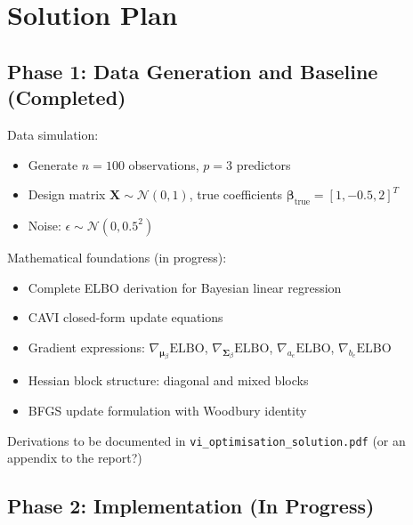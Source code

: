 \documentclass[11pt]{article}
\newcommand{\N}{\mathcal{N}}
\newcommand{\ELBO}{\text{ELBO}}
\begin{document}
\section*{Solution Plan}

\subsection*{Phase 1: Data Generation and Baseline (Completed)}

Data simulation:
\begin{itemize}
\item Generate $n = 100$ observations, $p = 3$ predictors
\item Design matrix $\bm{X} \sim \N(0, 1)$, true coefficients $\bm{\beta}_{\text{true}} = [1, -0.5, 2]^T$
\item Noise: $\epsilon \sim \N(0, 0.5^2)$
\end{itemize}

Mathematical foundations (in progress):
\begin{itemize}
\item Complete ELBO derivation for Bayesian linear regression
\item CAVI closed-form update equations
\item Gradient expressions: $\nabla_{\bm{\mu}_\beta} \ELBO$, $\nabla_{\bm{\Sigma}_\beta} \ELBO$, $\nabla_{a_e} \ELBO$, $\nabla_{b_e} \ELBO$
\item Hessian block structure: diagonal and mixed blocks
\item BFGS update formulation with Woodbury identity
\end{itemize}

Derivations to be documented in \texttt{vi\_optimisation\_solution.pdf} (or an appendix to the report?)

\subsection*{Phase 2: Implementation (In Progress)}
\end{document}
